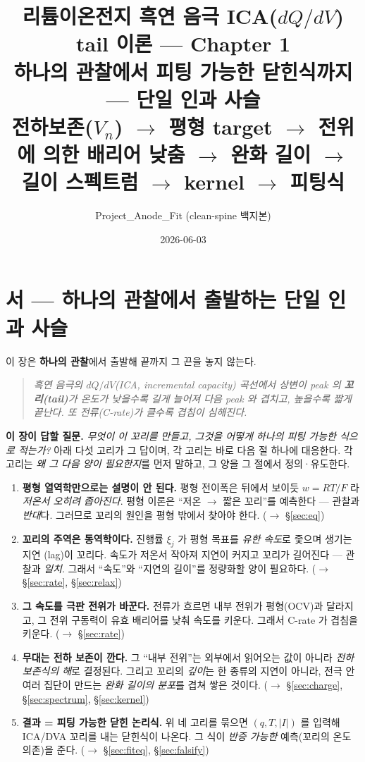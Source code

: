 \documentclass[11pt,a4paper]{article}
\title{\textbf{리튬이온전지 흑연 음극 ICA($dQ/dV$) tail 이론 — Chapter 1}\\[0.4em]
\large 하나의 관찰에서 피팅 가능한 닫힌식까지 — 단일 인과 사슬\\[0.2em]
\normalsize 전하보존($V_n$) $\to$ 평형 target $\to$ 전위에 의한 배리어 낮춤 $\to$ 완화 길이 $\to$ 길이 스펙트럼 $\to$ kernel $\to$ 피팅식}
\author{Project\_Anode\_Fit (clean-spine 백지본)}
\date{2026-06-03}
\begin{document}
\maketitle

\section*{서 — 하나의 관찰에서 출발하는 단일 인과 사슬}
이 장은 \textbf{하나의 관찰}에서 출발해 끝까지 그 끈을 놓지 않는다.
\begin{quote}\itshape
흑연 음극의 $dQ/dV$(ICA, incremental capacity) 곡선에서 상변이 peak 의 \textbf{꼬리(tail)}가 온도가
낮을수록 길게 늘어져 다음 peak 와 겹치고, 높을수록 짧게 끝난다. 또 전류(C-rate)가 클수록 겹침이 심해진다.
\end{quote}

\textbf{이 장이 답할 질문.} \emph{무엇이 이 꼬리를 만들고, 그것을 어떻게 하나의 피팅 가능한 식으로 적는가?}
아래 다섯 고리가 그 답이며, 각 고리는 바로 다음 절 하나에 대응한다. 각 고리는 \emph{왜 그 다음 양이
필요한지}를 먼저 말하고, 그 양을 그 절에서 정의·유도한다.

\begin{enumerate}[label=\textbf{(\arabic*)},leftmargin=2.4em]
\item \textbf{평형 열역학만으로는 설명이 안 된다.} 평형 전이폭은 뒤에서 보이듯 $w=RT/F$ 라 \emph{저온서 오히려
  좁아진다}. 평형 이론은 ``저온 $\to$ 짧은 꼬리''를 예측한다 — 관찰과 \emph{반대}다. 그러므로 꼬리의 원인을
  평형 밖에서 찾아야 한다. ($\to$ \S\ref{sec:eq})
\item \textbf{꼬리의 주역은 동역학이다.} 진행률 $\xi_j$ 가 평형 목표를 \emph{유한 속도}로 좇으며 생기는 지연
  (lag)이 꼬리다. 속도가 저온서 작아져 지연이 커지고 꼬리가 길어진다 — 관찰과 \emph{일치}. 그래서 ``속도''와
  ``지연의 길이''를 정량화할 양이 필요하다. ($\to$ \S\ref{sec:rate}, \S\ref{sec:relax})
\item \textbf{그 속도를 극판 전위가 바꾼다.} 전류가 흐르면 내부 전위가 평형(OCV)과 달라지고, 그 전위 구동력이
  유효 배리어를 낮춰 속도를 키운다. 그래서 C-rate 가 겹침을 키운다. ($\to$ \S\ref{sec:rate})
\item \textbf{무대는 전하 보존이 깐다.} 그 ``내부 전위''는 외부에서 읽어오는 값이 아니라 \emph{전하 보존식의
  해}로 결정된다. 그리고 꼬리의 \emph{깊이}는 한 종류의 지연이 아니라, 전극 안 여러 집단이 만드는
  \emph{완화 길이의 분포}를 겹쳐 쌓은 것이다. ($\to$ \S\ref{sec:charge}, \S\ref{sec:spectrum}, \S\ref{sec:kernel})
\item \textbf{결과 = 피팅 가능한 닫힌 논리식.} 위 네 고리를 묶으면 $(q,T,|I|)$ 를 입력해 ICA/DVA 꼬리를 내는
  닫힌식이 나온다. 그 식이 \emph{반증 가능한} 예측(꼬리의 온도 의존)을 준다. ($\to$ \S\ref{sec:fiteq}, \S\ref{sec:falsify})
\end{enumerate}
\end{document}
